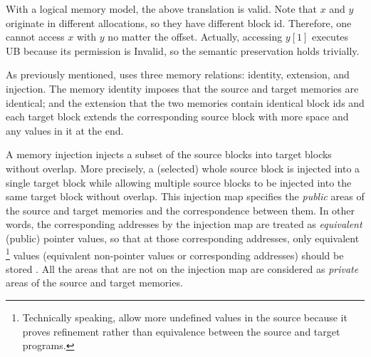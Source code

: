 With a logical memory model, the above translation is valid.
Note that $x$ and $y$ originate in different allocations, so they have different block id.
Therefore, one cannot access $x$ with $y$ no matter the offset.
Actually, accessing $y[1]$ executes UB because its permission is \textrm{Invalid}, so the semantic preservation holds trivially.



\label{sec:overview-verification:injection:original}
As previously mentioned, \cc{} uses three memory relations: identity, extension, and injection.
The memory identity imposes that the source and target memories are identical;
and the extension that the two memories contain identical block ids and
each target block extends the corresponding source block
with more space and any values in it at the end.

A memory injection injects a subset of the source blocks into target blocks
without overlap. More precisely, a (selected) whole source block is injected into a single target block
while allowing multiple source blocks to be injected into the same target block without overlap.
This injection map specifies the \emph{public} areas of the source and target memories and the correspondence between them.
In other words, the corresponding addresses by the injection map are treated as \emph{equivalent} (public) pointer values,
so that at those corresponding addresses,
only equivalent%
\footnote{Technically speaking, \cc{} allow more undefined values in the source
  because it proves refinement rather than equivalence between the source and target programs.}
values (\ie equivalent non-pointer values or corresponding addresses) should be stored .
All the areas that are not on the injection map are considered as \emph{private} areas of the source and target memories.


